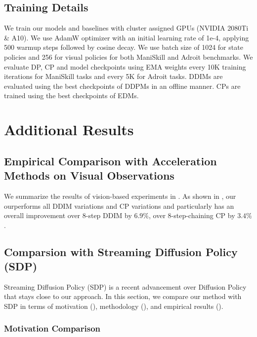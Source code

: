 \subsection{Training Details}
We train our models and baselines with cluster assigned GPUs (NVIDIA 2080Ti \& A10). We use AdamW optimizer with an initial learning rate of 1e-4, applying 500 warmup steps followed by cosine decay. We use batch size of 1024 for state policies and 256 for visual policies for both ManiSkill and Adroit benchmarks. We evaluate DP, CP and \ours model checkpoints using EMA weights every 10K training iterations for ManiSkill tasks and every 5K for Adroit tasks. DDIMs are evaluated using the best checkpoints of DDPMs in an offline manner. CPs are trained using the best checkpoints of EDMs.

\section{Additional Results}
\label{sup:additional_results}

\subsection{Empirical Comparison with Acceleration Methods on Visual Observations}
\label{sup:more_speed_claim_results}
We summarize the results of vision-based experiments in . As shown in , our \ours ourperforms all DDIM variations and CP variations and particularly has an overall improvement over 8-step DDIM by $6.9\%$, over 8-step-chaining CP by $3.4\%$.


\subsection{Comparsion with Streaming Diffusion Policy (SDP)}
\label{sup:sdp}

Streaming Diffusion Policy (SDP) \citep{høeg2024streamingdiffusionpolicyfast} is a recent advancement over Diffusion Policy that stays close to our approach. In this section, we compare our method with SDP in terms of motivation (), methodology (), and empirical results ().

\subsubsection{Motivation Comparison}
\label{sup:sdp_motivation}

